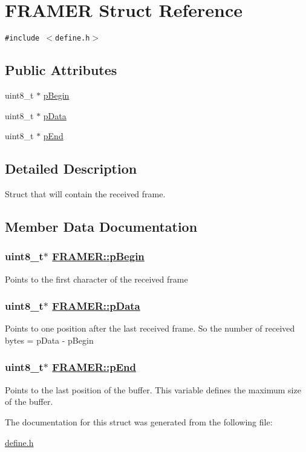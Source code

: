 \hypertarget{struct_f_r_a_m_e_r}{
\section{FRAMER Struct Reference}
\label{struct_f_r_a_m_e_r}
}
{\tt \#include $<$define.h$>$}

\subsection*{Public Attributes}
\begin{CompactItemize}
\item 
uint8\_\-t $\ast$ \hyperlink{struct_f_r_a_m_e_r_o0}{p\-Begin}
\item 
uint8\_\-t $\ast$ \hyperlink{struct_f_r_a_m_e_r_o1}{p\-Data}
\item 
uint8\_\-t $\ast$ \hyperlink{struct_f_r_a_m_e_r_o2}{p\-End}
\end{CompactItemize}


\subsection{Detailed Description}
Struct that will contain the received frame. 



\subsection{Member Data Documentation}
\hypertarget{struct_f_r_a_m_e_r_o0}{
\subsubsection[pBegin]{\setlength{\rightskip}{0pt plus 5cm}uint8\_\-t$\ast$ \hyperlink{struct_f_r_a_m_e_r_o0}{FRAMER::p\-Begin}}}
\label{struct_f_r_a_m_e_r_o0}


Points to the first character of the received frame \hypertarget{struct_f_r_a_m_e_r_o1}{
\subsubsection[pData]{\setlength{\rightskip}{0pt plus 5cm}uint8\_\-t$\ast$ \hyperlink{struct_f_r_a_m_e_r_o1}{FRAMER::p\-Data}}}
\label{struct_f_r_a_m_e_r_o1}


Points to one position after the last received frame. So the number of received bytes = p\-Data - p\-Begin \hypertarget{struct_f_r_a_m_e_r_o2}{
\subsubsection[pEnd]{\setlength{\rightskip}{0pt plus 5cm}uint8\_\-t$\ast$ \hyperlink{struct_f_r_a_m_e_r_o2}{FRAMER::p\-End}}}
\label{struct_f_r_a_m_e_r_o2}


Points to the last position of the buffer. This variable defines the maximum size of the buffer. 

The documentation for this struct was generated from the following file:\begin{CompactItemize}
\item 
\hyperlink{define_8h}{define.h}\end{CompactItemize}

